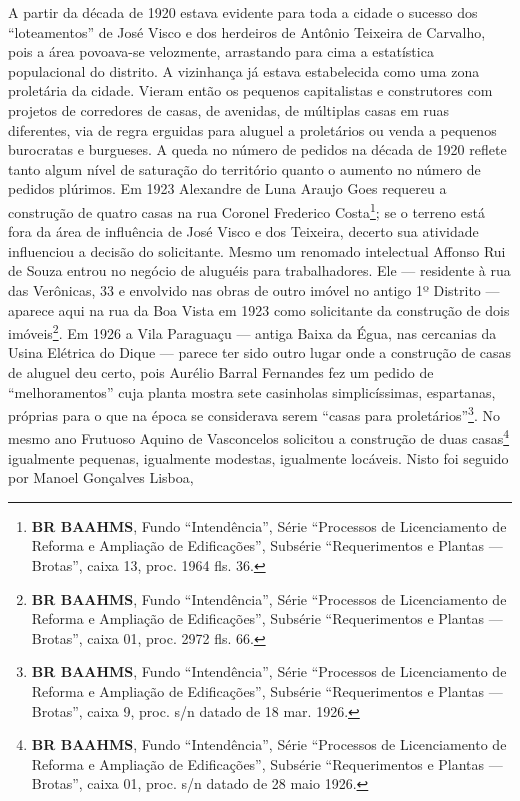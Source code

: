 A partir da década de 1920 estava evidente para toda a cidade o sucesso dos ``loteamentos'' de José Visco e dos herdeiros de Antônio Teixeira de Carvalho, pois a área povoava-se velozmente, arrastando para cima a estatística populacional do distrito. A vizinhança já estava estabelecida como uma zona proletária da cidade. Vieram então os pequenos capitalistas e construtores com projetos de corredores de casas, de avenidas, de múltiplas casas em ruas diferentes, via de regra erguidas para aluguel a proletários ou venda a pequenos burocratas e burgueses. A queda no número de pedidos na década de 1920 reflete tanto algum nível de saturação do território quanto o aumento no número de pedidos plúrimos. Em 1923 Alexandre de Luna Araujo Goes requereu a construção de quatro casas na rua Coronel Frederico Costa\footnote{\textbf{BR BAAHMS}, Fundo ``Intendência'', Série ``Processos de Licenciamento de Reforma e Ampliação de Edificações'', Subsérie ``Requerimentos e Plantas --- Brotas'', caixa 13, proc. 1964 fls. 36.}; se o terreno está fora da área de influência de José Visco e dos Teixeira, decerto sua atividade influenciou a decisão do solicitante. Mesmo um renomado intelectual Affonso Rui de Souza entrou no negócio de aluguéis para trabalhadores. Ele --- residente à rua das Verônicas, 33 e envolvido nas obras de outro imóvel no antigo 1º Distrito --- aparece aqui na rua da Boa Vista em 1923 como solicitante da construção de dois imóveis\footnote{\textbf{BR BAAHMS}, Fundo ``Intendência'', Série ``Processos de Licenciamento de Reforma e Ampliação de Edificações'', Subsérie ``Requerimentos e Plantas --- Brotas'', caixa 01, proc. 2972 fls. 66.}. Em 1926 a Vila Paraguaçu --- antiga Baixa da Égua, nas cercanias da Usina Elétrica do Dique \cite[p.~104]{souza_guia_1935} --- parece ter sido outro lugar onde a construção de casas de aluguel deu certo, pois Aurélio Barral Fernandes fez um pedido de ``melhoramentos'' cuja planta mostra sete casinholas simplicíssimas, espartanas, próprias para o que na época se considerava serem ``casas para proletários''\footnote{\textbf{BR BAAHMS}, Fundo ``Intendência'', Série ``Processos de Licenciamento de Reforma e Ampliação de Edificações'', Subsérie ``Requerimentos e Plantas --- Brotas'', caixa 9, proc. s/n datado de 18 mar. 1926.}. No mesmo ano Frutuoso Aquino de Vasconcelos solicitou a construção de duas casas\footnote{\textbf{BR BAAHMS}, Fundo ``Intendência'', Série ``Processos de Licenciamento de Reforma e Ampliação de Edificações'', Subsérie ``Requerimentos e Plantas --- Brotas'', caixa 01, proc. s/n datado de 28 maio 1926.} igualmente pequenas, igualmente modestas, igualmente locáveis. Nisto foi seguido por Manoel Gonçalves Lisboa, 